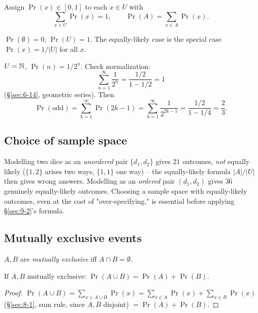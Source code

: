 \documentclass[11pt]{article}
\begin{document}
\begin{definition}
Assign $\Pr(x)\in[0,1]$ to each $x\in U$ with
\[
\sum_{x\in U} \Pr(x) = 1, \qquad \Pr(A) = \sum_{x\in A}\Pr(x).
\]
\end{definition}

\begin{note}
$\Pr(\emptyset)=0$, $\Pr(U)=1$. The equally-likely case is the special case $\Pr(x)=1/|U|$ for all $x$.
\end{note}

\begin{example}
$U=\mathbb{N}$, $\Pr(n)=1/2^n$. Check normalization:
\[
\sum_{n=1}^\infty \frac{1}{2^n} = \frac{1/2}{1-1/2} = 1
\]
(\S\ref{sec:6-14}, geometric series). Then
\[
\Pr(\text{odd}) = \sum_{k=1}^\infty \Pr(2k-1) = \sum_{k=1}^\infty \frac{1}{2^{2k-1}} = \frac{1/2}{1-1/4} = \frac{2}{3}.
\]
\end{example}

\subsection{Choice of sample space}
\label{sec:9-3}

\begin{note}
Modelling two dice as an \emph{unordered} pair $\{d_1,d_2\}$ gives $21$ outcomes, \emph{not} equally likely ($\{1,2\}$ arises two ways, $\{1,1\}$ one way) -- the equally-likely formula $|A|/|U|$ then gives wrong answers. Modelling as an \emph{ordered} pair $(d_1,d_2)$ gives $36$ genuinely equally-likely outcomes. Choosing a sample space with equally-likely outcomes, even at the cost of "over-specifying," is essential before applying \S\ref{sec:9-2}'s formula.
\end{note}

\subsection{Mutually exclusive events}
\label{sec:9-4}

\begin{definition}
$A,B$ are \emph{mutually exclusive} iff $A\cap B=\emptyset$.
\end{definition}

\begin{theorem}
If $A,B$ mutually exclusive: $\Pr(A\cup B)=\Pr(A)+\Pr(B)$.
\end{theorem}
\begin{proof}
$\Pr(A\cup B)=\sum_{x\in A\cup B}\Pr(x) = \sum_{x\in A}\Pr(x)+\sum_{x\in B}\Pr(x)$ (\S\ref{sec:8-1}, sum rule, since $A,B$ disjoint) $=\Pr(A)+\Pr(B)$.
\end{proof}
\end{document}
